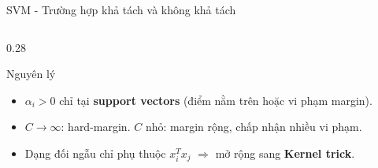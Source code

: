 \begin{frame}[shrink=40]{SVM - Trường hợp khả tách và không khả tách}
\begin{columns}[T]
\begin{column}{0.28\textwidth}
            \begin{alertblock}{Nguyên lý}
                \begin{itemize}
                    \item $\alpha_i > 0$ chỉ tại \textbf{support vectors} (điểm nằm trên hoặc vi phạm margin).
                    \item $C \to \infty$: hard-margin. $C$ nhỏ: margin rộng, chấp nhận nhiều vi phạm.
                    \item Dạng đối ngẫu chỉ phụ thuộc $x_i^Tx_j$ $\Rightarrow$ mở rộng sang \textbf{Kernel trick}.
                \end{itemize}
            \end{alertblock}
        \end{column}
    \end{columns}
\end{frame}


